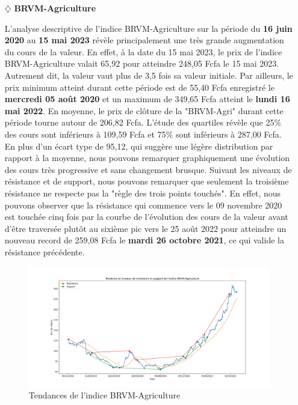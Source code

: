 \begin{itemize}
    \item[$\diamondsuit$] \textbf{BRVM-Agriculture}
    \par{L'analyse descriptive de l'indice BRVM-Agriculture sur la période du \textbf{16 juin 2020} au
        \textbf{15 mai 2023} révèle principalement une très grande augmentation du cours de la valeur.
        En effet, à la date du 15 mai 2023, le prix de l'indice BRVM-Agriculture valait 65,92 pour atteindre
        248,05 Fcfa le 15 mai 2023. Autrement dit, la valeur vaut plus de 3,5 fois sa valeur initiale. 
        Par ailleurs, le prix minimum atteint durant cette période est de 55,40 Fcfa enregistré le
        \textbf{mercredi 05 août 2020} et un maximum de 349,65 Fcfa atteint le \textbf{lundi 16 mai 2022}.
        En moyenne, le prix de clôture de la "BRVM-Agri" durant cette période tourne autour de 206,82 Fcfa.
        L'étude des quartiles révèle que 25\% des cours sont inférieurs à 109,59 Fcfa et 75\% sont 
        inférieurs à 287,00 Fcfa. En plus d'un écart type de 95,12, qui suggère une légère 
        distribution par rapport à la moyenne, nous pouvons remarquer graphiquement une évolution des cours 
        très progressive et sans changement brusque.
        Suivant les niveaux de résistance et de support, nous pouvons remarquer que seulement la troisième 
        résistance ne respecte pas la "règle des trois points touchés".
        En effet, nous pouvons observer que la résistance qui commence vers le 09 novembre 2020 
        est touchée cinq fois par la courbe de l'évolution des cours de la valeur avant d'être traversée
        plutôt au sixième pic vers le 25 août 2022 pour atteindre un nouveau record de 259,08 Fcfa le
        \textbf{mardi 26 octobre 2021}, ce qui valide la résistance précédente.}

        \begin{figure}[h]
            \centering
            \includegraphics[width=1 \textwidth ]{img/agri_tendance.jpg}
            \caption{Tendances de l'indice BRVM-Agriculture}
            \label{fig:Tendance de l'indice BRVM-Agriculture}
        \end{figure}
\end{itemize}



